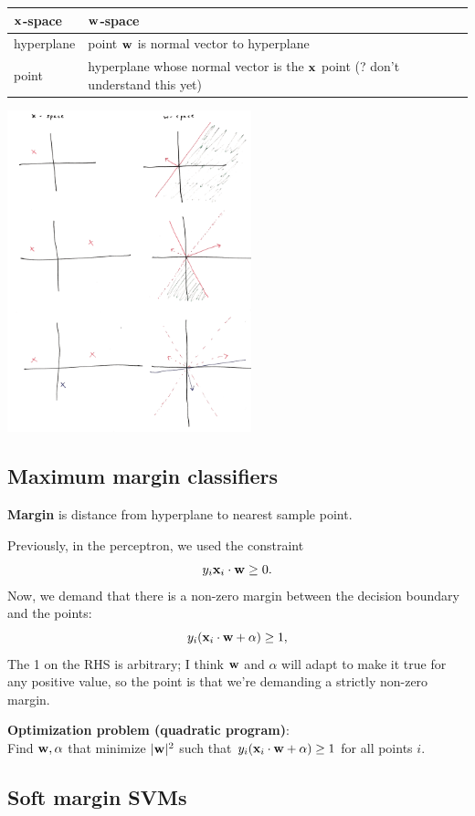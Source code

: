 \documentclass[12pt]{article}
\begin{document}
\begin{tabular}{l|l}
  $\mathbf x$-space    & $\mathbf w$-space \\
  \hline
  hyperplane & point $\mathbf w$ is normal vector to hyperplane \\
  point      & hyperplane whose normal vector is the $\mathbf x$ point (? don't understand this yet)
\end{tabular}

\includegraphics[width=200pt]{img/ml-perceptron-x-space-w-space.png}

\subsection{Maximum margin classifiers}
\textbf{Margin} is distance from hyperplane to nearest sample point.

Previously, in the perceptron, we used the constraint
$$y_i \mathbf x_i \cdot \mathbf w \geq 0.$$
Now, we demand that there is a non-zero margin between the decision boundary
and the points:
$$y_i (\mathbf x_i \cdot \mathbf w + \alpha) \geq 1,$$
The 1 on the RHS is arbitrary; I think $\mathbf w$ and $\alpha$ will adapt to make it
true for any positive value, so the point is that we're demanding a strictly
non-zero margin.
\\
\begin{mdframed}
  \textbf{Optimization problem (quadratic program)}:\\
    Find $\mathbf w, \alpha$ that minimize $|\mathbf w|^2$ such that
    $y_i(\mathbf x_i \cdot \mathbf w + \alpha) \geq 1$ for all points $i$.
\end{mdframed}

\subsection{Soft margin SVMs}
\end{document}
